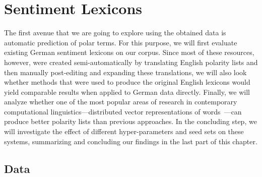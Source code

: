 

\chapter{Sentiment Lexicons}\label{chap:snt:lex}

The first avenue that we are going to explore using the obtained data
is automatic prediction of polar terms.
For this purpose, we will first evaluate existing German sentiment
lexicons on our corpus.  Since most of these resources, however, were
created semi-automatically by translating English polarity lists and
then manually post-editing and expanding these translations, we will
also look whether methods that were used to produce the original
English lexicons would yield comparable results when applied to German
data directly.  Finally, we will analyze whether one of the most
popular areas of research in contemporary computational
linguistics---distributed vector representations of
words~\cite{Mikolov:13}---can produce better polarity lists than
previous approaches.  In the concluding step, we will investigate the
effect of different hyper-parameters and seed sets on these systems,
summarizing and concluding our findings in the last part of this
chapter.

\section{Data}\label{sec:snt-lex:data}

